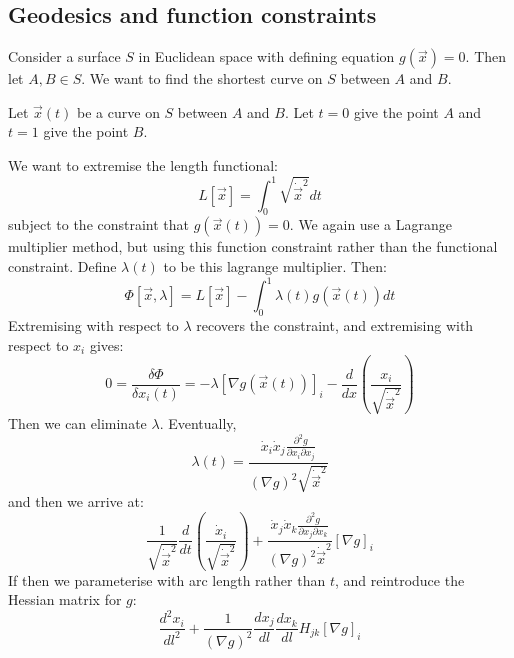 \documentclass[../Main.tex]{subfiles}
\begin{document}
\subsection{Geodesics and function constraints}
Consider a surface $S$ in Euclidean space with defining equation $g(\vec{x}) = 0$. Then let $A, B \in S$. We want to find the shortest curve on $S$ between $A$ and $B$.

Let $\vec{x}(t)$ be a curve on $S$ between $A$ and $B$. Let $t = 0$ give the point $A$ and $t = 1$ give the point $B$.

We want to extremise the length functional:
\begin{equation*}
    L[\vec{x}] = \int_0^1 \sqrt{\dot{\vec{x}}^2} dt
\end{equation*}
subject to the constraint that $g(\vec{x}(t)) = 0$. We again use a Lagrange multiplier method, but using this function constraint rather than the functional constraint. Define $\lambda(t)$ to be this lagrange multiplier. Then:
\begin{equation*}
    \Phi[\vec{x}, \lambda] = L[\vec{x}] - \int_0^1 \lambda(t) g(\vec{x}(t)) dt
\end{equation*}
Extremising with respect to $\lambda$ recovers the constraint, and extremising with respect to $x_i$ gives:
\begin{equation*}
    0 = \frac{\delta \Phi}{\delta x_i(t)} = -\lambda \left[\nabla g(\vec{x}(t))\right]_i -\frac{d}{dx} \left(\frac{x_i}{\sqrt{\dot{\vec{x}}^2}}\right)
\end{equation*}
Then we can eliminate $\lambda$. Eventually,
\begin{equation*}
    \lambda(t) = \frac{\dot{x}_i \dot{x}_j \frac{\partial^2 g}{\partial x_i \partial x_j}}{(\nabla g)^2 \sqrt{\dot{\vec{x}}^2}}
\end{equation*}
and then we arrive at:
\begin{equation*}
    \frac{1}{\sqrt{\dot{\vec{x}}^2}} \frac{d}{dt}\left(\frac{\dot{x}_i}{\sqrt{\dot{\vec{x}}^2}}\right) + \frac{\dot{x}_j \dot{x}_k \frac{\partial^2 g}{\partial x_j \partial x_k}}{(\nabla g)^2 \dot{\vec{x}}^2} [\nabla g]_i
\end{equation*}
If then we parameterise with arc length rather than $t$, and reintroduce the Hessian matrix for $g$:
\begin{equation*}
    \frac{d^2 x_i}{dl^2} + \frac{1}{(\nabla g)^2}\frac{dx_j}{dl} \frac{dx_k}{dl} H_{jk} [\nabla g]_i
\end{equation*}
\end{document}
